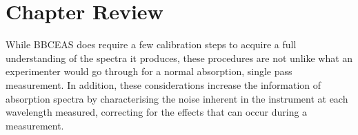 \section*{Chapter Review}

While \ac{BBCEAS} does require a few calibration steps to acquire a full
understanding of the spectra it produces, these procedures are not unlike
what an experimenter would go through for a normal absorption, single pass
measurement. In addition, these considerations increase the information of
absorption spectra by characterising the noise inherent in the instrument at
each wavelength measured, correcting for the effects that can occur during a
measurement.
